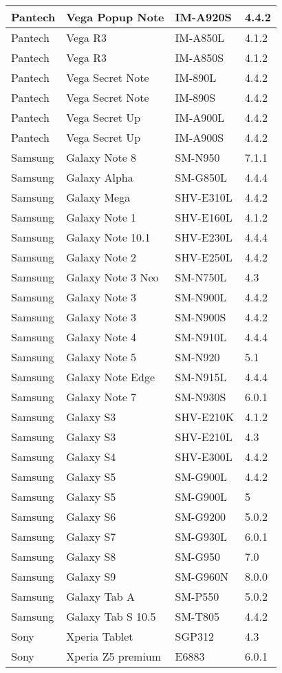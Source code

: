 \begin{appendices}
\begin{longtable}{ | l | l | l | l |}
Pantech&Vega Popup Note&IM-A920S&4.4.2\\ \hline
Pantech&Vega R3&IM-A850L&4.1.2\\ \hline
Pantech&Vega R3&IM-A850S&4.1.2\\ \hline
Pantech&Vega Secret Note&IM-890L&4.4.2\\ \hline
Pantech&Vega Secret Note&IM-890S&4.4.2\\ \hline
Pantech&Vega Secret Up&IM-A900L&4.4.2\\ \hline
Pantech&Vega Secret Up&IM-A900S&4.4.2\\ \hline
Samsung&Galaxy Note 8&SM-N950&7.1.1\\ \hline
Samsung&Galaxy Alpha&SM-G850L&4.4.4\\ \hline
Samsung&Galaxy Mega&SHV-E310L&4.4.2\\ \hline
Samsung&Galaxy Note 1&SHV-E160L&4.1.2\\ \hline
Samsung&Galaxy Note 10.1&SHV-E230L&4.4.4\\ \hline
Samsung&Galaxy Note 2&SHV-E250L&4.4.2\\ \hline
Samsung&Galaxy Note 3 Neo&SM-N750L&4.3\\ \hline
Samsung&Galaxy Note 3&SM-N900L&4.4.2\\ \hline
Samsung&Galaxy Note 3&SM-N900S&4.4.2\\ \hline
Samsung&Galaxy Note 4&SM-N910L&4.4.4\\ \hline
Samsung&Galaxy Note 5&SM-N920&5.1\\ \hline
Samsung&Galaxy Note Edge&SM-N915L&4.4.4\\ \hline
Samsung&Galaxy Note 7&SM-N930S&6.0.1\\ \hline
Samsung&Galaxy S3&SHV-E210K&4.1.2\\ \hline
Samsung&Galaxy S3&SHV-E210L&4.3\\ \hline
Samsung&Galaxy S4&SHV-E300L&4.4.2\\ \hline
Samsung&Galaxy S5&SM-G900L&4.4.2\\ \hline
Samsung&Galaxy S5&SM-G900L&5\\ \hline
Samsung&Galaxy S6&SM-G9200&5.0.2\\ \hline
Samsung&Galaxy S7&SM-G930L&6.0.1\\ \hline
Samsung&Galaxy S8&SM-G950&7.0\\ \hline
Samsung&Galaxy S9&SM-G960N&8.0.0\\ \hline
Samsung&Galaxy Tab A&SM-P550&5.0.2\\ \hline
Samsung&Galaxy Tab S 10.5&SM-T805&4.4.2\\ \hline
Sony&Xperia Tablet&SGP312&4.3\\ \hline
Sony&Xperia Z5 premium&E6883&6.0.1\\ \hline


\end{longtable}
\end{appendices}
